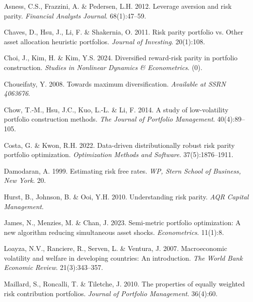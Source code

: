 \documentclass[11pt,preprint]{elsarticle}
\numberwithin{equation}{section}
\numberwithin{figure}{section}
\numberwithin{table}{section}
\newlength{\cslhangindent}
\newenvironment{CSLReferences}[2] %
{\begin{list}{}{%
	\setlength{\itemindent}{0pt}
	\setlength{\leftmargin}{0pt}
	\setlength{\parsep}{0pt}
	\ifodd #1
	\setlength{\leftmargin}{\cslhangindent}
	\setlength{\itemindent}{-1\cslhangindent}
	\fi
	\setlength{\itemsep}{#2\baselineskip}}}
{\end{list}}
\begin{document}
\label{refs}
\begin{CSLReferences}{1}{1}
Asness, C.S., Frazzini, A. \& Pedersen, L.H. 2012. Leverage aversion and
risk parity. \emph{Financial Analysts Journal}. 68(1):47--59.

Chaves, D., Hsu, J., Li, F. \& Shakernia, O. 2011. Risk parity portfolio
vs. Other asset allocation heuristic portfolios. \emph{Journal of
Investing}. 20(1):108.

Choi, J., Kim, H. \& Kim, Y.S. 2024. Diversified reward-risk parity in
portfolio construction. \emph{Studies in Nonlinear Dynamics \&
Econometrics}. (0).

Choueifaty, Y. 2008. Towards maximum diversification. \emph{Available at
SSRN 4063676}.

Chow, T.-M., Hsu, J.C., Kuo, L.-L. \& Li, F. 2014. A study of
low-volatility portfolio construction methods. \emph{The Journal of
Portfolio Management}. 40(4):89--105.

Costa, G. \& Kwon, R.H. 2022. Data-driven distributionally robust risk
parity portfolio optimization. \emph{Optimization Methods and Software}.
37(5):1876--1911.

Damodaran, A. 1999. Estimating risk free rates. \emph{WP, Stern School
of Business, New York}. 20.

Hurst, B., Johnson, B. \& Ooi, Y.H. 2010. Understanding risk parity.
\emph{AQR Capital Management}.

James, N., Menzies, M. \& Chan, J. 2023. Semi-metric portfolio
optimization: A new algorithm reducing simultaneous asset shocks.
\emph{Econometrics}. 11(1):8.

Loayza, N.V., Ranciere, R., Serven, L. \& Ventura, J. 2007.
Macroeconomic volatility and welfare in developing countries: An
introduction. \emph{The World Bank Economic Review}. 21(3):343--357.

Maillard, S., Roncalli, T. \& Tiletche, J. 2010. The properties of
equally weighted risk contribution portfolios. \emph{Journal of
Portfolio Management}. 36(4):60.


\end{CSLReferences}
\end{document}
